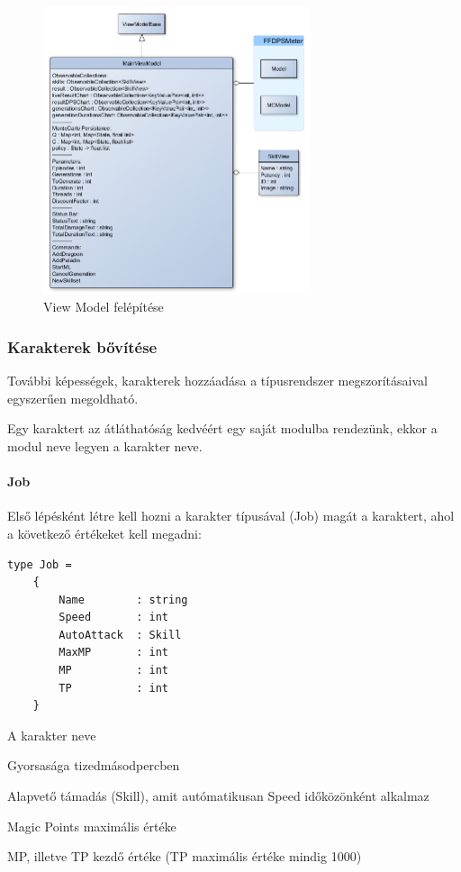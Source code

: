 \documentclass[12pt]{article}
\begin{document}
\begin{figure}[H]
	\begin{center}
		\includegraphics[width=0.7\textwidth]{viewmodel}
	\end{center}
	\caption{View Model felépítése}
	\label{fig:viewmodel}
\end{figure}

\subsubsection{Karakterek bővítése}

További képességek, karakterek hozzáadása a típusrendszer megszorításaival egyszerűen megoldható.

Egy karaktert az átláthatóság kedvéért egy saját modulba rendezünk, ekkor a modul neve legyen a karakter neve.

\paragraph{Job} Első lépésként létre kell hozni a karakter típusával (Job) magát a karaktert, ahol a következő értékeket kell megadni:

\begin{lstlisting}
type Job =
	{
		Name        : string
		Speed       : int
		AutoAttack  : Skill
		MaxMP       : int
		MP          : int
		TP          : int
	}
\end{lstlisting}

\begin{description}[align=left,labelwidth=2.5cm]
	\item [Name] A karakter neve
	\item [Speed] Gyorsasága tizedmásodpercben
	\item [AutoAttack] Alapvető támadás (Skill), amit autómatikusan Speed időközönként alkalmaz
	\item [MaxMP] Magic Points maximális értéke
	\item [MP, TP] MP, illetve TP kezdő értéke (TP maximális értéke mindig 1000)
\end{description}
\end{document}
